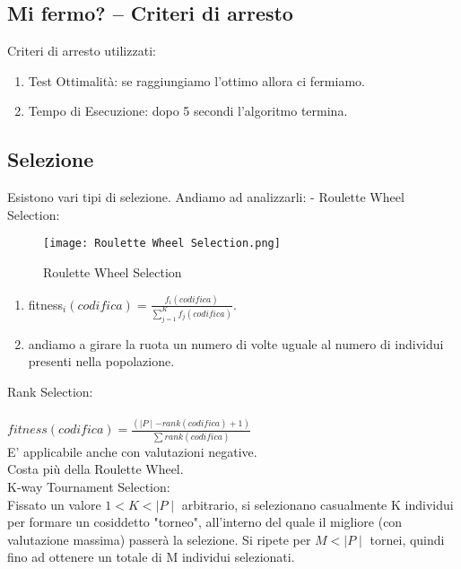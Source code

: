 \documentclass[10pt,a4paper]{article}
\begin{document}
      \newpage
      
    \subsection{Mi fermo? -- Criteri di arresto}
    \label{MiFermo?--CriteriDiArrestoSubsection}
    Criteri di arresto utilizzati:
    \begin{enumerate}
      \item Test Ottimalità: se raggiungiamo l’ottimo allora ci fermiamo.
      \item Tempo di Esecuzione: dopo 5 secondi l’algoritmo termina.
    \end{enumerate}
    
    \subsection{Selezione}
    \label{Selezione}
    Esistono vari tipi di selezione. Andiamo ad analizzarli:
    - Roulette Wheel Selection:
    \begin{figure}[h!]
      \centering
      \caption{Roulette Wheel Selection}
      \texttt{[image: Roulette Wheel Selection.png]}
      \label{RouletteWheelSelection}
    \end{figure}
    \begin{enumerate}
      \item fitness$_{i}(codifica) =\frac{f_{i}(codifica)}{\sum\limits_{j = 1}^{K} {f_{j} (codifica)}}$.
      \item andiamo a girare la ruota un numero di volte uguale al numero di individui presenti nella 
            popolazione.
    \end{enumerate} 
    
    \newpage
    
    Rank Selection:\\\\
    $ fitness(codifica) = \frac {(\mid P \mid - rank(codifica) + 1)} {\sum{rank(codifica)}}$\\
    E’ applicabile anche con valutazioni negative.\\
    Costa più della Roulette Wheel.\\
    
    K-way Tournament Selection:\\
    Fissato un valore $1 < K < \mid P \mid$ arbitrario, si selezionano casualmente K individui per formare un 
    cosiddetto "torneo", all’interno del quale il migliore (con valutazione massima) passerà la 
    selezione. Si ripete per $M < \mid P \mid$ tornei, quindi fino ad ottenere un totale di M individui 
    selezionati.\\\\
    
\end{document}
